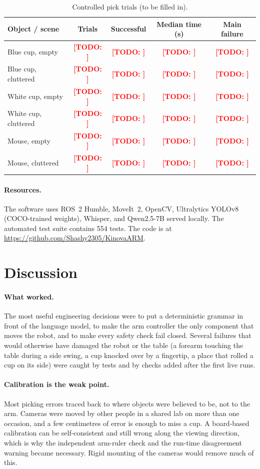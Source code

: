 \documentclass[12pt]{article}
\newcommand{\todo}[1]{\textcolor{red}{\textbf{[TODO: #1]}}}
\begin{document}
\begin{table}[H]
\centering
\caption{Controlled pick trials (to be filled in).}
\label{tab:controlled}
\begin{tabular}{lcccc}
\toprule
Object / scene & Trials & Successful & Median time (s) & Main failure \\
\midrule
Blue cup, empty      & \todo{} & \todo{} & \todo{} & \todo{} \\
Blue cup, cluttered  & \todo{} & \todo{} & \todo{} & \todo{} \\
White cup, empty     & \todo{} & \todo{} & \todo{} & \todo{} \\
White cup, cluttered & \todo{} & \todo{} & \todo{} & \todo{} \\
Mouse, empty         & \todo{} & \todo{} & \todo{} & \todo{} \\
Mouse, cluttered     & \todo{} & \todo{} & \todo{} & \todo{} \\
\bottomrule
\end{tabular}
\end{table}

\paragraph{Resources.}
The software uses ROS~2 Humble, MoveIt~2, OpenCV, Ultralytics YOLOv8 (COCO-trained weights), Whisper, and Qwen2.5-7B served locally. The automated test suite contains 554 tests. The code is at \url{https://github.com/Shashy2305/KinovaARM}.

\section{Discussion}

\paragraph{What worked.}
The most useful engineering decisions were to put a deterministic grammar in front of the language model, to make the arm controller the only component that moves the robot, and to make every safety check fail closed. Several failures that would otherwise have damaged the robot or the table (a forearm touching the table during a side swing, a cup knocked over by a fingertip, a place that rolled a cup on its side) were caught by tests and by checks added after the first live runs.

\paragraph{Calibration is the weak point.}
Most picking errors traced back to where objects were believed to be, not to the arm. Cameras were moved by other people in a shared lab on more than one occasion, and a few centimetres of error is enough to miss a cup. A board-based calibration can be self-consistent and still wrong along the viewing direction, which is why the independent arm-ruler check and the run-time disagreement warning became necessary. Rigid mounting of the cameras would remove much of this.
\end{document}
